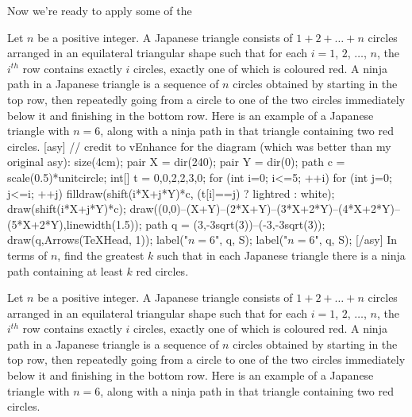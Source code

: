 \documentclass[11pt]{scrartcl}
\theoremstyle{plain} %
\theoremstyle{definition}
\theoremstyle{remark}
\theoremstyle{empty}
\theoremstyle{empty}
\theoremstyle{empty}
\theoremstyle{empty}
\theoremstyle{empty}
\theoremstyle{empty}
\begin{document}
Now we're ready to apply some of the 

\begin{problem}[2023 IMO/5]
	Let $n$ be a positive integer. A Japanese triangle consists of $1 + 2 + \dots + n$ circles arranged in an equilateral triangular shape such that for each $i = 1$, $2$, $\dots$, $n$, the $i^{th}$ row contains exactly $i$ circles, exactly one of which is coloured red. A ninja path in a Japanese triangle is a sequence of $n$ circles obtained by starting in the top row, then repeatedly going from a circle to one of the two circles immediately below it and finishing in the bottom row. Here is an example of a Japanese triangle with $n = 6$, along with a ninja path in that triangle containing two red circles.
[asy]
// credit to vEnhance for the diagram (which was better than my original asy):
size(4cm);
  pair X = dir(240); pair Y = dir(0);
  path c = scale(0.5)*unitcircle;
  int[] t = {0,0,2,2,3,0};
  for (int i=0; i<=5; ++i) {
    for (int j=0; j<=i; ++j) {
      filldraw(shift(i*X+j*Y)*c, (t[i]==j) ? lightred : white);
      draw(shift(i*X+j*Y)*c);
    }
  }
  draw((0,0)--(X+Y)--(2*X+Y)--(3*X+2*Y)--(4*X+2*Y)--(5*X+2*Y),linewidth(1.5));
  path q = (3,-3sqrt(3))--(-3,-3sqrt(3));
  draw(q,Arrows(TeXHead, 1));
  label("$n = 6$", q, S);
label("$n = 6$", q, S);
[/asy]
In terms of $n$, find the greatest $k$ such that in each Japanese triangle there is a ninja path containing at least $k$ red circles.
\end{problem}



\begin{problem}
Let $n$ be a positive integer. A Japanese triangle consists of $1 + 2 + \dots + n$ circles arranged in an equilateral triangular shape such that for each $i = 1$, $2$, $\dots$, $n$, the $i^{th}$ row contains exactly $i$ circles, exactly one of which is coloured red. A ninja path in a Japanese triangle is a sequence of $n$ circles obtained by starting in the top row, then repeatedly going from a circle to one of the two circles immediately below it and finishing in the bottom row. Here is an example of a Japanese triangle with $n = 6$, along with a ninja path in that triangle containing two red circles.
\end{problem}

\begin{problem}[2013 ISL C4]

\end{problem}
\end{document}
